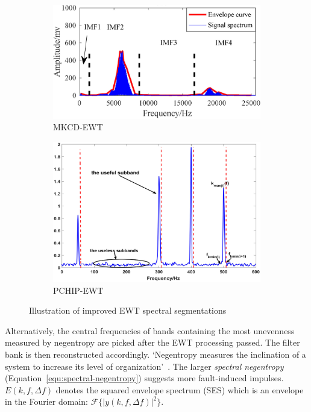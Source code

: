 \begin{figure}[ht]
    \centering
    \begin{subfigure}[b]{0.49\textwidth}
        \includegraphics[width=\textwidth]{assets/MKCD-EWT.png}
        \caption{MKCD-EWT~\cite{li_fault_2019}}
        \label{fig:mkcd-ewt-segmentation}
    \end{subfigure}
    \hfill
    \begin{subfigure}[b]{0.49\textwidth}
        \includegraphics[width=\textwidth]{assets/PCHIP-EWT.png}
        \caption{PCHIP-EWT~\cite{zhuang_improved_2020}}
        \label{fig:pchip-ewt-segmentation}
    \end{subfigure}
    \caption{Illustration of improved EWT spectral segmentations}
\end{figure}

Alternatively, the central frequencies of bands containing the most unevenness measured by negentropy are picked after the EWT processing passed. The filter bank is then reconstructed accordingly. `Negentropy measures the inclination of a system to increase its level of organization'~\cite{avoci_spectral_2020}. The larger \emph{spectral negentropy} (Equation~\ref{equ:spectral-negentropy}) suggests more fault-induced impulses. $E(k, f, \Delta f)$ denotes the squared envelope spectrum (SES) which is an envelope in the Fourier domain: $\mathcal{F}\{ |y(k, f, \Delta f)|^2 \}$.

